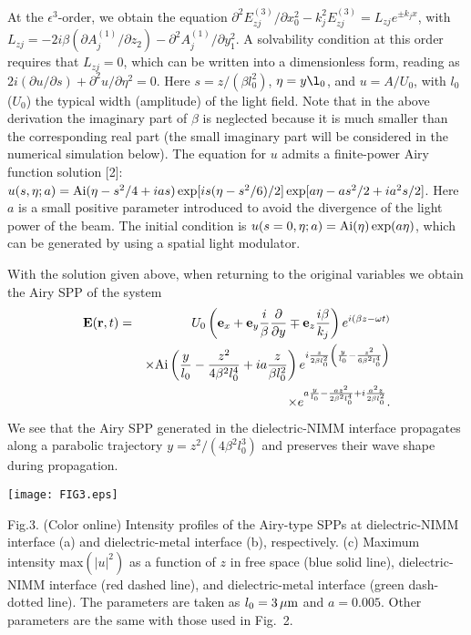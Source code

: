 \documentclass[aps,pra,preprint,groupedaddress,amsmath,amssymb,showpacs]{revtex4-1}
\begin{document}
\vskip 0.75cm

At the $\epsilon^3$-order, we obtain the equation
$\partial^2E^{(3)}_{zj}/\partial x_0^2-k_j^2E^{(3)}_{zj}=L_{zj}e^{\pm k_jx}$,
with $L_{zj}=-2i\beta(\partial A_j^{(1)}/\partial z_2)-\partial^2 A_j^{(1)}/\partial y_1^2$. A solvability condition at this order requires that $L_{zj}=0$, which can be written into a dimensionless form, reading as
$2i(\partial u/\partial s)+\partial^2 u/\partial \eta^2=0$.
Here $s=z/(\beta l_0^2)$, $\eta=y\l_0$, and $u=A/U_0$, with
$l_0$ ($U_0$) the typical width (amplitude) of the light field. Note that in the above derivation
the imaginary part of $\beta$ is neglected because it is much smaller than the corresponding real part (the small imaginary part will be considered in the numerical simulation below). The equation for $u$ admits a finite-power Airy function solution [2]:
$u(s,\eta;a)={\rm Ai}(\eta-{s^2}/{4}+ias)\exp[i{s}
(\eta-{s^2}/{6})/{2}]\exp[a\eta-{as^2}/{2}+i{a^2s}/{2}]$.
Here $a$ is a small positive parameter introduced to avoid the divergence of the light power of the beam.
The initial condition is $u(s=0,\eta;a)={\rm Ai}(\eta)\exp(a\eta)$, which can be generated by using a
spatial light modulator.
%

\vskip 0.75cm

With the solution given above, when returning to the original variables
we obtain the Airy SPP of the system
\begin{eqnarray}
\nonumber {\bf E}({\bf r},t)&=&U_0\left({\bf e}_x+{\bf e}_y\frac{i}{\beta}\frac{\partial}{\partial y}\mp{\bf e}_z\frac{i\beta}{k_j}\right)e^{i(\beta z-\omega t)}\notag\\
&&\times{\rm Ai}\left(\frac{y}{l_0}-\frac{z^2}{4\beta^2 l_0^4}+ia\frac{z}{\beta l_0^2}\right)e^{i\frac{z}{2\beta l_0^2}\left(\frac{y}{l_0}-\frac{z^2}{6\beta^2 l_0^4}\right)}\notag\\
&&\times e^{a\frac{y}{l_0}-\frac{az^2}{2\beta^2l_0^4}+i\frac{a^2z}{2\beta l_0^2}}.
\label{explicit linear solution}
\end{eqnarray}
%
We see that the Airy SPP generated in the dielectric-NIMM interface propagates along a parabolic
trajectory $y=z^2/(4\beta^2l_0^3)$ and preserves their wave shape during propagation.
%

%
\begin{center}
\texttt{[image: FIG3.eps]}
\end{center}
\vskip 0.5cm \small \rm Fig.\hspace{0.1cm}3. (Color online) Intensity profiles of the Airy-type SPPs at dielectric-NIMM interface (a) and dielectric-metal interface (b), respectively. (c) Maximum intensity max$(|u|^2)$ as a function of $z$ in free space (blue solid line), dielectric-NIMM interface (red dashed line), and dielectric-metal interface (green dash-dotted line). The parameters are taken as $l_0=3\,{\rm \mu m}$ and $a=0.005$. Other parameters are the same with those used in Fig.~2.
\vskip 0.8cm \noindent \normalsize
%
\end{document}
